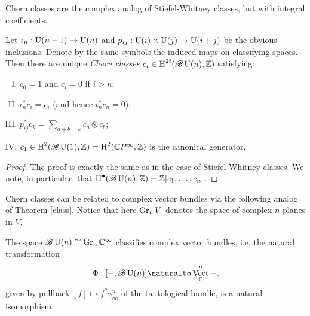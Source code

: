 \documentclass{amsart}
\DeclareMathOperator{\Vect}{Vect}
\begin{document}
Chern classes are the complex analog of Stiefel-Whitney classes, but with integral coefficients.
\begin{theorem}
    Let $\iota_n:\operatorname{U}(n-1)\to\operatorname{U}(n)$ and $p_{ij}:\operatorname{U}(i)\times \operatorname{U}(j)\to \operatorname{U}(i+j)$ be the obvious
    inclusions. Denote by the same symbols the induced maps on classifying spaces.
    Then there are unique \textit{Chern classes} $c_i\in \operatorname{H}^{2i}(\mathscr{B}\operatorname{U}(n), \mathbb{Z})$ satisfying:
    \begin{enumerate}[(I)]
        \item $c_0=1$ and $c_i=0$ if $i>n$;
        \item $\iota_n^*c_i=c_i$ (and hence $\iota_n^*c_n=0$);
        \item $p_{ij}^*c_k=\sum_{a+b=k}c_a\otimes c_b$;
        \item $c_1\in\operatorname{H}^2(\mathscr{B}\operatorname{U}(1),\mathbb{Z})=\operatorname{H}^2(\mathbb{C} P^\infty,\mathbb{Z})$ is the canonical generator.
    \end{enumerate}
    \label{chern}
\end{theorem}
\begin{proof}
    The proof is exactly the same as in the case of Stiefel-Whitney classes.
    We note, in particular, that $\operatorname{H}^\bullet(\mathscr{B}\operatorname{U}(n),\mathbb{Z})=\mathbb{Z}[c_1,\ldots,c_n]$.
\end{proof}

Chern classes can be related to complex vector bundles via the following analog of Theorem
\ref{class}. Notice that here $\operatorname{Gr}_n V$ denotes the space of complex $n$-planes in $V$.
\begin{theorem}
    The space $\mathscr{B}\operatorname{U}(n)\cong\operatorname{Gr}_n\mathbb{C}^\infty$ classifies complex vector bundles, i.e. the natural
    transformation
    \begin{equation*}
        \Phi: [-,\mathscr{B}\UU(n)] \naturalto \Vect_\C^n-,
    \end{equation*}
    given by pullback $[f]\mapsto f^*\gamma^n_\infty$ of the tautological bundle, is a natural isomorphism.
\end{theorem}
\end{document}
